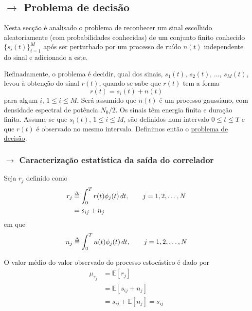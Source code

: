 \clearpage
\subsection[4.2 Problema de decisão]{$\rightarrow$ Problema de decisão}
\label{subsec:optimum-receiver-coherent-detection}

Nesta secção é analisado o problema de reconhecer um sinal escolhido aleatoriamente (com probabilidades conhecidas) de um conjunto finito conhecido $\{s_i(t)\}_{i=1}^{M}$ após ser perturbado por um processo de ruído $n(t)$ independente do sinal e adicionado a este. 

Refinadamente, o problema é decidir, qual dos sinais, $s_1(t)$, $s_2(t)$, $\dots$, $s_M(t)$, levou à obtenção do sinal $r(t)$, quando se sabe que $r(t)$ tem a forma
$$
    r(t) = s_i(t) + n(t)
$$
para algum $i$, $1 \leq i \leq M$. Será assumido que $n(t)$ é um processo gaussiano, com densidade espectral de potência $N_0/2$. Os sinais têm energia finita e duração finita. Assume-se que $s_i(t)$, $1 \leq i \leq M$, são definidos num intervalo $0 \leq t \leq T$ e que $r(t)$ é observado no mesmo intervalo. Definimos então o \underline{problema de decisão}.

\subsubsection[4.2.1 Caracterização estatística da saída do correlador]{$\rightarrow$ Caracterização estatística da saída do correlador}

Seja $r_j$ definido como
\begin{align*}
    r_j &\delequal \int_{0}^{T} r(t) \phi_j(t)\, dt,\qquad j=1,2,\dots,N \\
    &= s_{ij} + n_{j}
\end{align*}
em que 
$$
    n_j \delequal \int_{0}^{T} n(t) \phi_j(t)\, dt,\qquad j=1,2,\dots,N
$$

\noindent O valor médio do valor observado do processo estocástico é dado por
\begin{align*}
    \mu_{r_j} &= \mathbb{E}[r_j] \\
    &= \mathbb{E}[s_{ij} + n_j] \\
    &= s_{ij} + \mathbb{E}[n_j] = s_{ij}
\end{align*}


